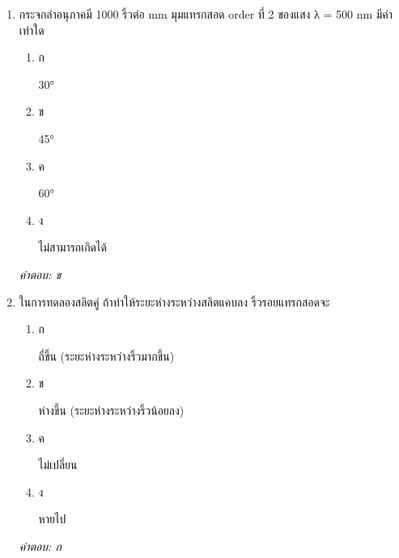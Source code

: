 \documentclass[12pt]{article}
\begin{document}
\begin{enumerate}[label=\arabic*., itemsep=0.5\baselineskip, topsep=0.5\baselineskip, leftmargin=*]
\item กระจกลำอนุภาคมี 1000 ริ้วต่อ mm มุมแทรกสอด order ที่ 2 ของแสง λ = 500 nm มีค่าเท่าใด
\begin{enumerate}[label=\alph*)., itemsep=0.3\baselineskip, topsep=0.3\baselineskip]
\item ก\ 
\begin{minipage}[t]{0.9\linewidth}
\raggedright 30°
\end{minipage}
\item ข\ 
\begin{minipage}[t]{0.9\linewidth}
\raggedright 45°
\end{minipage}
\item ค\ 
\begin{minipage}[t]{0.9\linewidth}
\raggedright 60°
\end{minipage}
\item ง\ 
\begin{minipage}[t]{0.9\linewidth}
\raggedright ไม่สามารถเกิดได้
\end{minipage}
\end{enumerate}
\vspace{-0.3\baselineskip}
\begin{small}
\textit{คำตอบ: ข}
\end{small}

\item ในการทดลองสลิตคู่ ถ้าทำให้ระยะห่างระหว่างสลิตแคบลง ริ้วรอยแทรกสอดจะ
\begin{enumerate}[label=\alph*)., itemsep=0.3\baselineskip, topsep=0.3\baselineskip]
\item ก\ 
\begin{minipage}[t]{0.9\linewidth}
\raggedright ถี่ขึ้น (ระยะห่างระหว่างริ้วมากขึ้น)
\end{minipage}
\item ข\ 
\begin{minipage}[t]{0.9\linewidth}
\raggedright ห่างขึ้น (ระยะห่างระหว่างริ้วน้อยลง)
\end{minipage}
\item ค\ 
\begin{minipage}[t]{0.9\linewidth}
\raggedright ไม่เปลี่ยน
\end{minipage}
\item ง\ 
\begin{minipage}[t]{0.9\linewidth}
\raggedright หายไป
\end{minipage}
\end{enumerate}
\vspace{-0.3\baselineskip}
\begin{small}
\textit{คำตอบ: ก}
\end{small}


\end{enumerate}
\end{document}
